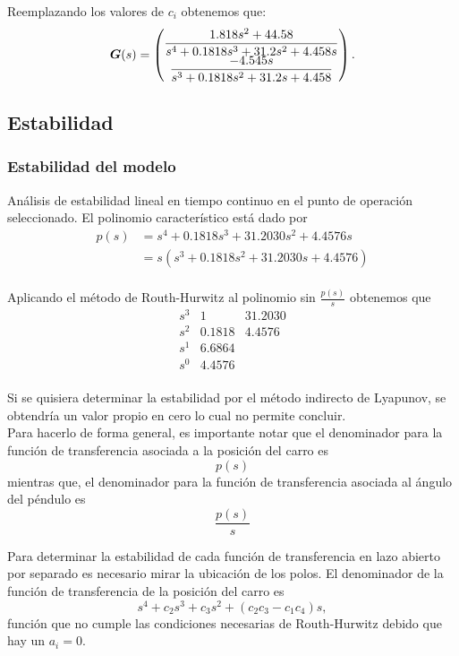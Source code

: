 Reemplazando los valores de $c_i$ obtenemos que:
\[ \vb*{G}(s) =
  \begin{pmatrix}
    \dfrac{1.818 s^2 + 44.58}{s^4 + 0.1818 s^3 + 31.2 s^2 + 4.458 s}\\
    \dfrac{-4.545 s}{s^3 + 0.1818 s^2 + 31.2 s + 4.458}
  \end{pmatrix}.
\]

\subsection{Estabilidad}
\subsubsection{Estabilidad del modelo}
Análisis de estabilidad lineal en tiempo continuo en el punto de operación seleccionado. El polinomio característico está dado por
\begin{equation}
  \label{eq:polcar}
  \begin{split}
  p(s)
  &= s^4 + 0.1818 s^3 + 31.2030 s^2 + 4.4576 s\\
  &= s (s^3 + 0.1818 s^2 + 31.2030 s + 4.4576) \\
\end{split}
\end{equation}
\textbf{}

Aplicando el método de Routh-Hurwitz al polinomio sin $\frac{p(s)}{s}$ obtenemos que
\[
  \begin{array}{c|cc}
    s^3 & 1 & 31.2030\\
    s^2 & 0.1818 & 4.4576\\
    s^1 & 6.6864 &\\
    s^0 & 4.4576 &
  \end{array}
\]
\\

Si se quisiera determinar la estabilidad por el método indirecto de Lyapunov\cite{Murray:1994:MIR:561828}, se obtendría un valor propio en cero lo cual no permite concluir.\\

Para hacerlo de forma general, es importante notar que el denominador para la función de transferencia asociada a la posición del carro es \[ p(s) \] mientras que, el denominador para la función de transferencia asociada al ángulo del péndulo es \[ \frac{p(s)}{s} \]

Para determinar la estabilidad de cada función de transferencia en lazo abierto por separado es necesario mirar la ubicación de los polos. El denominador de la función de transferencia de la posición del carro es \[ s^4 + c_2 s^3 + c_3 s^2 + (c_2 c_3 - c_1 c_4)s, \] función que no cumple las condiciones necesarias de Routh-Hurwitz debido que hay un $a_i = 0$.\\

